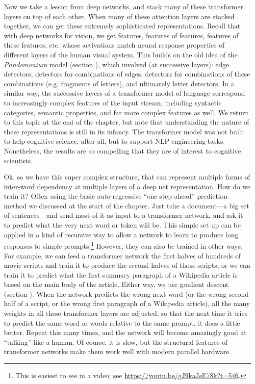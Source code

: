 Now we take a lesson from deep networks, and stack many of these transformer layers on top of each other. 
When many of these attention layers are stacked together, we can get these extremely sophisticated representations.  Recall that with deep networks for vision, we get features, features of features, features of these features, etc. whose activations match neural response properties of different layers of the human visual system. This builds on the old idea of the \emph{Pandemonium} model (section ), which involved (at successive layers): edge detectors, detectors for combinations of edges, detectors for combinations of these combinations (e.g. fragments of letters), and ultimately letter detectors. In a similar way, the successive layers of a transformer model of language correspond to increasingly complex features of the input stream, including syntactic categories, semantic properties, and far more complex features as well. We return to this topic at the end of the chapter, but note that understanding the nature of these representations is still in its infancy. The transformer model was not built to help cognitive science, after all, but to support NLP engineering tasks. Nonetheless, the results are so compelling that they are of interest to cognitive scientists.

Ok, so we have this super complex structure, that can represent multiple forms of inter-word dependency at multiple layers of a deep net representation. How do we train it?  Often using the basic auto-regressive ``one step-ahead'' prediction method we discussed at the start of the chapter. Just take a document---a big set of sentences---and send most of it as input to a transformer network, and ask it to predict what the very next word or token will be. This simple set up can be applied in a kind of recursive way to allow a network to learn to produce long responses to simple prompts.\footnote{This is easiest to see in a video; see \url{https://youtu.be/gJ9kaJsE78k?t=546}.}  However, they can also be trained in other ways. For example, we can feed a transformer network the first halves of hundreds of movie scripts and train it to produce the second halves of those scripts, or we can train it to predict what the first summary paragraph of a Wikipedia article is based on the main body of the article. Either way, we use gradient descent (section ).  When the network predicts the wrong next word (or the wrong second half of a script, or the wrong first paragraph of a Wikipedia article), all the many weights in all these transformer layers are adjusted, so that the next time it tries to predict the same word or words relative to the same prompt, it does a little better. Repeat this many times, and the network will become amazingly good at ``talking'' like a human. Of course, it is slow, but the structural features of transformer networks make them work well with modern parallel hardware.

